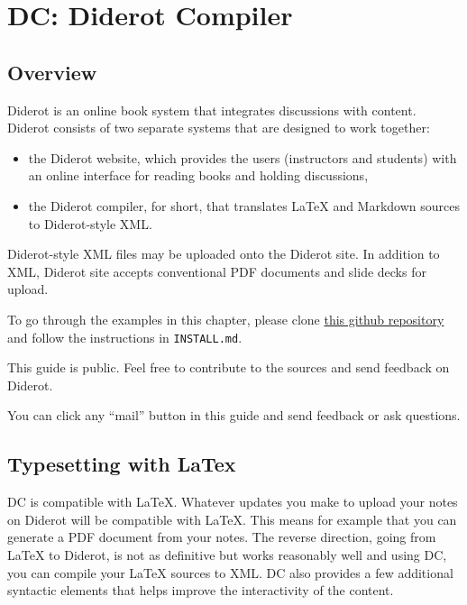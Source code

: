 \chapter{DC: Diderot Compiler}
\label{mtl}
 

\section{Overview}

Diderot is an online book system that integrates discussions with
content.  Diderot consists of two separate systems that are
designed to work together:
%
\begin{itemize}
\item the Diderot website, which
provides the users (instructors and students) with an online interface
for reading books and holding discussions, 
\item the Diderot
compiler,  for short, that translates LaTeX and Markdown
sources to Diderot-style XML.
\end{itemize}
%
Diderot-style XML files may be uploaded onto the Diderot site. 
%
In addition to XML, Diderot site accepts conventional PDF documents
and slide decks for upload. 
%


\begin{important}
To go through the examples in this chapter, please clone 
%
\href{https://github.com/diderot-edu/guide}{this github repository}
%
and follow the instructions in \lstinline`INSTALL.md`. 

This guide is public.  Feel free to contribute to the sources and send feedback on Diderot.  
\end{important}

\begin{note}
You can click any ``mail''  button in this guide and send feedback or ask questions. 
\end{note}

\section{Typesetting with LaTex}

DC is compatible with LaTeX. Whatever updates you make to upload your notes on Diderot will be compatible with LaTeX. 
%
This means for example that you can generate a PDF document from your notes.
%
The reverse direction, going from LaTeX to Diderot, is not as definitive but works reasonably well and using DC, you can compile your LaTeX sources to XML.
%
DC also provides a few additional syntactic elements that helps improve the interactivity of the content.  
%

